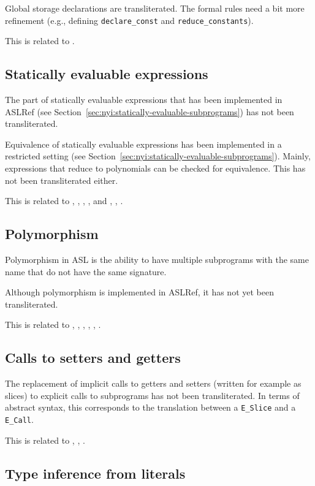 \documentclass{book}
\begin{document}
Global storage declarations are transliterated.
The formal rules need a bit more refinement (e.g., defining \texttt{declare\_const} and \texttt{reduce\_constants}).

This is related to .

\subsection{Statically evaluable expressions}

The part of statically evaluable expressions that has been implemented in
ASLRef (see Section~\ref{sec:nyi:statically-evaluable-subprograms}) has not
been transliterated.

Equivalence of statically evaluable expressions has been implemented in a
restricted setting (see
Section~\ref{sec:nyi:statically-evaluable-subprograms}).
%
Mainly, expressions that reduce to polynomials can be checked for equivalence.
%
This has not been transliterated either.

This is related to , , , ,
and , , .

\subsection{Polymorphism}

Polymorphism in ASL is the ability to have multiple subprograms with the same
name that do not have the same signature.

Although polymorphism is implemented in ASLRef, it has not yet been
transliterated.

This is related to , , , ,
, .

\subsection{Calls to setters and getters}

The replacement of implicit calls to getters and setters (written for example as
slices) to explicit calls to subprograms has not been transliterated.
%
In terms of abstract syntax, this corresponds to the translation between a
\texttt{E\_Slice} and a \texttt{E\_Call}.

This is related to , , .

\subsection{Type inference from literals}
\end{document}
